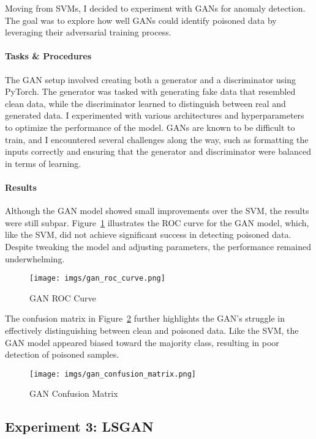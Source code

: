 \documentclass[14]{article}
\begin{document}
Moving from SVMs, I decided to experiment with GANs for anomaly detection. The goal was to explore how well GANs could identify poisoned data by leveraging their adversarial training process.

\paragraph{Tasks \& Procedures}

The GAN setup involved creating both a generator and a discriminator using PyTorch. The generator was tasked with generating fake data that resembled clean data, while the discriminator learned to distinguish between real and generated data. I experimented with various architectures and hyperparameters to optimize the performance of the model. GANs are known to be difficult to train, and I encountered several challenges along the way, such as formatting the inputs correctly and ensuring that the generator and discriminator were balanced in terms of learning.

\paragraph{Results}

Although the GAN model showed small improvements over the SVM, the results were still subpar. Figure~\ref{fig:gan_roc} illustrates the ROC curve for the GAN model, which, like the SVM, did not achieve significant success in detecting poisoned data. Despite tweaking the model and adjusting parameters, the performance remained underwhelming.

\begin{figure}[h]
    \centering
    \texttt{[image: imgs/gan\_roc\_curve.png]}
    \caption{GAN ROC Curve}
    \label{fig:gan_roc}
\end{figure}

The confusion matrix in Figure~\ref{fig:gan_confuse} further highlights the GAN’s struggle in effectively distinguishing between clean and poisoned data. Like the SVM, the GAN model appeared biased toward the majority class, resulting in poor detection of poisoned samples.

\begin{figure}[h]
    \centering
    \texttt{[image: imgs/gan\_confusion\_matrix.png]}
    \caption{GAN Confusion Matrix}
    \label{fig:gan_confuse}
\end{figure}

\subsection{Experiment 3: LSGAN}
\end{document}
